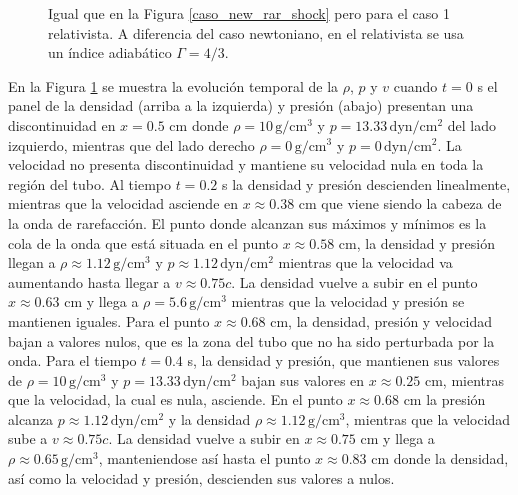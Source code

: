 \documentclass[12pt,a4paper]{book}
\begin{document}
\begin{figure}
    \caption{Igual que en la Figura \ref{caso_new_rar_shock} pero para el caso 1 relativista. A diferencia 
    del caso newtoniano, en el relativista se usa un índice 
    adiabático $\Gamma = 4/3$. \label{caso_rel_rar_shock_1}}
\end{figure}

En la Figura \ref{caso_rel_rar_shock_1} se muestra la evolución temporal de la $\rho$, $p$ y $v$
cuando $t = 0$ s el panel de la densidad 
(arriba a la izquierda) 
y presión (abajo) presentan una discontinuidad en $x = 0.5$ cm donde $\rho = 10 \,  \text{g}/ \text{cm}^3$
y $p = 13.33 \,  \text{dyn}/ \text{cm}^2 $ del lado izquierdo, mientras que del lado derecho $\rho = 0  \,  \text{g}/ \text{cm}^3$
y $p = 0 \,  \text{dyn}/ \text{cm}^2 $. La velocidad no presenta discontinuidad y mantiene su 
velocidad nula en toda la región del tubo. 
Al tiempo $t =0.2$ s la densidad y presión 
descienden linealmente, mientras que la velocidad asciende en $x \approx 0.38$ cm
que viene siendo la cabeza de la onda de rarefacción. El punto donde alcanzan 
sus máximos y mínimos es la cola de la onda que está situada en el punto $x \approx 0.58$ cm,
la densidad y presión llegan a $\rho \approx 1.12 \,  \text{g}/ \text{cm}^3$ y 
$p \approx 1.12\,  \text{dyn}/ \text{cm}^2 $ mientras que la velocidad
va aumentando hasta llegar a $v \approx 0.75c$. La densidad vuelve a subir en el punto $x \approx 0.63$ cm
y llega a $\rho = 5.6  \,  \text{g}/ \text{cm}^3$ mientras que la velocidad y presión se mantienen iguales. Para el punto
$x \approx 0.68$ cm, la densidad, presión y velocidad bajan a valores nulos, que es la zona del tubo que
no ha sido perturbada por la onda.
Para el tiempo $t = 0.4$ s, la densidad y presión, que mantienen sus valores de 
$\rho = 10 \,  \text{g}/ \text{cm}^3$ y 
$p = 13.33 \,  \text{dyn}/ \text{cm}^2 $ bajan sus valores en $x \approx 0.25$ cm, mientras que la velocidad, la cual es nula,
asciende. En el punto $x \approx 0.68$ cm la presión alcanza $p \approx 1.12\,  \text{dyn}/ \text{cm}^2 $ y la densidad
$\rho \approx 1.12 \,  \text{g}/ \text{cm}^3$, mientras que la velocidad sube a $v \approx 0.75c$. 
La densidad vuelve a subir
en $x \approx 0.75$ cm y llega a $\rho \approx 0.65 \,  \text{g}/ \text{cm}^3$, manteniendose así hasta el punto $x \approx 0.83$ cm
donde la densidad, así como la velocidad y presión, descienden sus valores a nulos.
\end{document}
